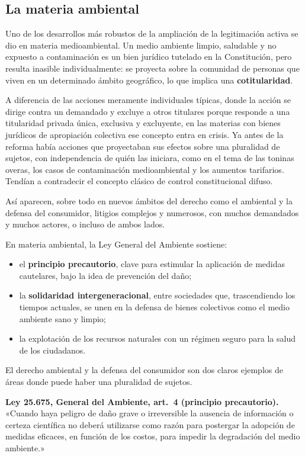 \documentclass[12pt,oneside]{book}
\begin{document}
\subsection{La materia ambiental}

Uno de los desarrollos más robustos de la ampliación de la legitimación activa se dio en materia medioambiental. Un medio ambiente limpio, saludable y no expuesto a contaminación es un bien jurídico tutelado en la Constitución, pero resulta inasible individualmente: se proyecta sobre la comunidad de personas que viven en un determinado ámbito geográfico, lo que implica una \textbf{cotitularidad}.

A diferencia de las acciones meramente individuales típicas, donde la acción se dirige contra un demandado y excluye a otros titulares porque responde a una titularidad privada única, exclusiva y excluyente, en las materias con bienes jurídicos de apropiación colectiva ese concepto entra en crisis. Ya antes de la reforma había acciones que proyectaban sus efectos sobre una pluralidad de sujetos, con independencia de quién las iniciara, como en el tema de las toninas overas, los casos de contaminación medioambiental y los aumentos tarifarios. Tendían a contradecir el concepto clásico de control constitucional difuso.

Así aparecen, sobre todo en nuevos ámbitos del derecho como el ambiental y la defensa del consumidor, litigios complejos y numerosos, con muchos demandados y muchos actores, o incluso de ambos lados.

En materia ambiental, la Ley General del Ambiente sostiene:

\begin{itemize}
    \item el \textbf{principio precautorio}, clave para estimular la aplicación de medidas cautelares, bajo la idea de prevención del daño;
    \item la \textbf{solidaridad intergeneracional}, entre sociedades que, trascendiendo los tiempos actuales, se unen en la defensa de bienes colectivos como el medio ambiente sano y limpio;
    \item la explotación de los recursos naturales con un régimen seguro para la salud de los ciudadanos.
\end{itemize}

El derecho ambiental y la defensa del consumidor son dos claros ejemplos de áreas donde puede haber una pluralidad de sujetos.

\begin{note}
\textbf{Ley 25.675, General del Ambiente, art.\ 4 (principio precautorio).} «Cuando haya peligro de daño grave o irreversible la ausencia de información o certeza científica no deberá utilizarse como razón para postergar la adopción de medidas eficaces, en función de los costos, para impedir la degradación del medio ambiente.»
\end{note}
\end{document}
